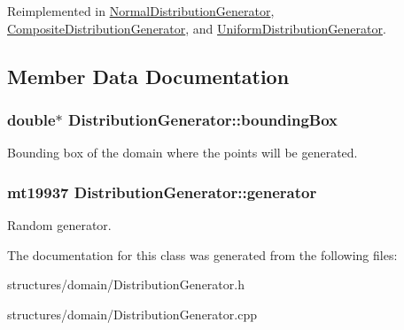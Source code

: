 Reimplemented in \hyperlink{class_normal_distribution_generator_a858dfdfc16ab4367bf41ed76831eae45}{Normal\+Distribution\+Generator}, \hyperlink{class_composite_distribution_generator_a799c7a57b895245c81a9492ddff63384}{Composite\+Distribution\+Generator}, and \hyperlink{class_uniform_distribution_generator_a9f40ba5dca7db03833f00a846218ae68}{Uniform\+Distribution\+Generator}.



\subsection{Member Data Documentation}
\subsubsection[{\texorpdfstring{bounding\+Box}{boundingBox}}]{\setlength{\rightskip}{0pt plus 5cm}double$\ast$ Distribution\+Generator\+::bounding\+Box\hspace{0.3cm}{\ttfamily [protected]}}\hypertarget{class_distribution_generator_abbb670b1d48a4820559097b85bf6ee2d}{}\label{class_distribution_generator_abbb670b1d48a4820559097b85bf6ee2d}
Bounding box of the domain where the points will be generated. 
\subsubsection[{\texorpdfstring{generator}{generator}}]{\setlength{\rightskip}{0pt plus 5cm}mt19937 Distribution\+Generator\+::generator\hspace{0.3cm}{\ttfamily [protected]}}\hypertarget{class_distribution_generator_a875697de8d5c0a4d18e473e483a9646c}{}\label{class_distribution_generator_a875697de8d5c0a4d18e473e483a9646c}
Random generator. 

The documentation for this class was generated from the following files\+:\begin{DoxyCompactItemize}
\item 
structures/domain/Distribution\+Generator.\+h\item 
structures/domain/Distribution\+Generator.\+cpp\end{DoxyCompactItemize}
